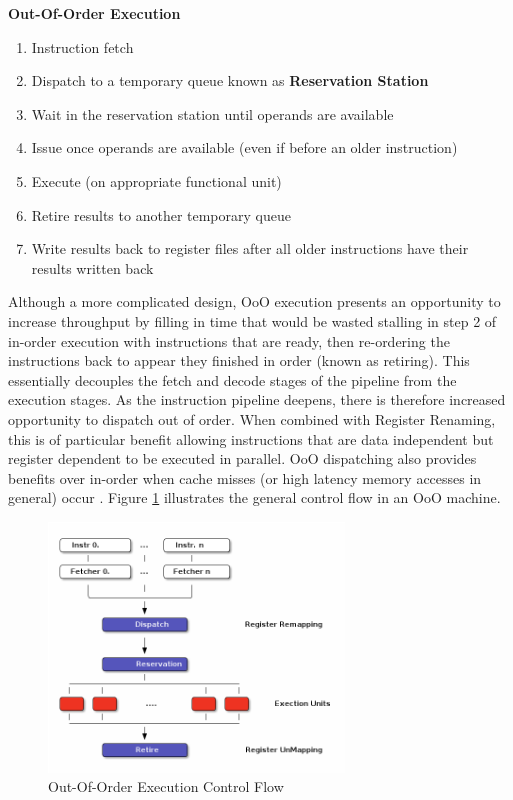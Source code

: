 \documentclass[12pt]{report}
\begin{document}
\noindent
\textbf{Out-Of-Order Execution}
\begin{enumerate}
\item Instruction fetch
\item Dispatch to a temporary queue known as \textbf{Reservation Station}
\item Wait in the reservation station until operands are available
\item Issue once operands are available (even if before an older
instruction)
\item Execute (on appropriate functional unit)
\item Retire results to another temporary queue
\item Write results back to register files after all older instructions have their results written back
\end{enumerate}

Although a more complicated design, OoO execution presents an opportunity to
increase throughput by filling in time that would be wasted stalling in step
2 of in-order execution with instructions that are ready, then re-ordering
the instructions back to appear they finished in order (known as retiring).
This essentially decouples the fetch and decode stages of the pipeline from
the execution stages. As the instruction pipeline deepens, there is therefore
increased opportunity to dispatch out of order. When combined with Register
Renaming, this is of particular benefit allowing instructions that are data
independent but register dependent to be executed in parallel. OoO
dispatching also provides benefits over in-order when cache misses (or high
latency memory accesses in general) occur \parencite{stark1997reducing}.
Figure \ref{fig:OutOfOrder} illustrates the general control flow in an OoO machine.

\begin{figure}[htbp]
\centering
\includegraphics[width=0.7\textwidth]{figures/OoODiagram.png}
\caption{\label{fig:OutOfOrder}
Out-Of-Order Execution Control Flow}
\end{figure}
\end{document}
